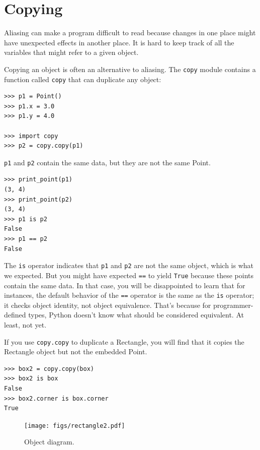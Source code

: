 \documentclass[10pt]{book}
\begin{document}
\section{Copying}
\label{copying}

Aliasing can make a program difficult to read because changes
in one place might have unexpected effects in another place.
It is hard to keep track of all the variables that might refer
to a given object.

Copying an object is often an alternative to aliasing.
The {\tt copy} module contains a function called {\tt copy} that
can duplicate any object:

\begin{verbatim}
>>> p1 = Point()
>>> p1.x = 3.0
>>> p1.y = 4.0

>>> import copy
>>> p2 = copy.copy(p1)
\end{verbatim}
%
{\tt p1} and {\tt p2} contain the same data, but they are
not the same Point.

\begin{verbatim}
>>> print_point(p1)
(3, 4)
>>> print_point(p2)
(3, 4)
>>> p1 is p2
False
>>> p1 == p2
False
\end{verbatim}
%
The {\tt is} operator indicates that {\tt p1} and {\tt p2} are not the
same object, which is what we expected.  But you might have expected
{\tt ==} to yield {\tt True} because these points contain the same
data.  In that case, you will be disappointed to learn that for
instances, the default behavior of the {\tt ==} operator is the same
as the {\tt is} operator; it checks object identity, not object
equivalence.  That's because for programmer-defined types, Python doesn't
know what should be considered equivalent.  At least, not yet.

If you use {\tt copy.copy} to duplicate a Rectangle, you will find
that it copies the Rectangle object but not the embedded Point.

\begin{verbatim}
>>> box2 = copy.copy(box)
>>> box2 is box
False
>>> box2.corner is box.corner
True
\end{verbatim}

\begin{figure}
\centerline
{\texttt{[image: figs/rectangle2.pdf]}}
\caption{Object diagram.}
\label{fig.rectangle2}
\end{figure}
\end{document}
